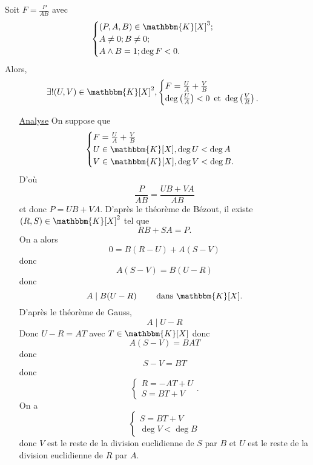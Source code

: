 \begin{lem}
	Soit $F = \frac{P}{AB}$ avec \[
		\begin{cases}
			(P, A, B) \in \mathbbm{K}[X]^3;\\
			A\neq 0; B\neq 0;\\
			A\wedge B = 1;
			\deg F < 0.
		\end{cases}
	\] Alors, \[
		\exists! (U,V) \in \mathbbm{K}[X]^2, \begin{cases}
			F = \frac{U}{A} + \frac{V}{B}\\
			\deg\left( \frac{U}{A} \right) < 0 \et \deg\left( \frac{V}{R} \right).
		\end{cases}
	\]
\end{lem}

\begin{prv}
	\begin{itemize}
		\item[\underline{\sc Analyse}] On suppose que \[
				\begin{cases}
					F = \frac{U}{A} + \frac{V}{B}\\
					U \in \mathbbm{K}[X], \deg U < \deg A\\
					V \in \mathbbm{K}[X], \deg V < \deg B.
				\end{cases}
			\] D'où \[
				\frac{P}{AB} = \frac{UB+VA}{AB}
			\] et donc $P = UB + VA$. D'après le théorème de Bézout, il existe $(R,S) \in \mathbbm{K}[X]^2$ tel que \[
				RB+SA = P.
			\] On a alors \[
				0 = B(R-U) + A(S-V)
			\] donc \[
				A (S-V) = B(U-R)
			\] donc \[
				A  \mid  B(U-R) \qquad \text{ dans }\mathbbm{K}[X].
			\] D'après le théorème de Gauss, \[
				A  \mid U - R
			\] 
			Donc $U-R = AT$ avec $T \in \mathbbm{K}[X]$ donc \[
				A(S-V) = BAT
			\] donc \[
				S-V = BT
			\] donc \[
				\begin{cases}
					R = -AT + U\\
					S = BT + V
				\end{cases}.
			\]
			On a \[
				\begin{cases}
					S = BT+V\\
					\deg V < \deg B
				\end{cases}
			\] donc $V$ est le reste de la division euclidienne de $S$ par $B$ et $U$ est le reste de la division euclidienne de $R$ par $A$.


\end{itemize}
\end{prv}
